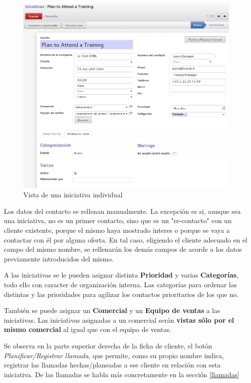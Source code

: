 \begin{figure}[H]
\includegraphics[width=\textwidth]{ventas/img/ven_iniindividual.png}
\caption{Vista de una iniciativa individual}
\label{ven:iniindividual}
\end{figure}

Los datos del contacto se rellenan manualmente. La excepción es si, aunque sea una iniciativa, no es un primer contacto, sino que es un "re-contacto" con un cliente existente, porque el mismo haya mostrado interes o porque se vaya a contactar con él por alguna oferta. En tal caso, eligiendo el cliente adecuado en el campo del mismo nombre, se rellenarán los demás campos de acorde a los datos previamente introducidos del mismo.

A las iniciativas se le pueden asignar distinta \textbf{Prioridad} y varias \textbf{Categorías}, todo ello con caracter de organización interna. Las categorías para ordenar las distintas y las prioridades para agilizar los contactos prioritarios de los que no.

También se puede asignar un \textbf{Comercial} y un \textbf{Equipo de ventas} a las iniciativas. Las iniciativas asignadas a un comercial serán \textbf{vistas sólo por el mismo comercial} al igual que con el equipo de ventas.

Se observa en la parte superior derecha de la ficha de cliente, el botón \emph{Planificar/Registrar llamada}, que permite, como su propio nombre indica, registrar las llamadas hechas/planeadas a ese cliente en relación con esta iniciativa. De las llamadas se habla más concretamente en la sección \ref{llamadas}

